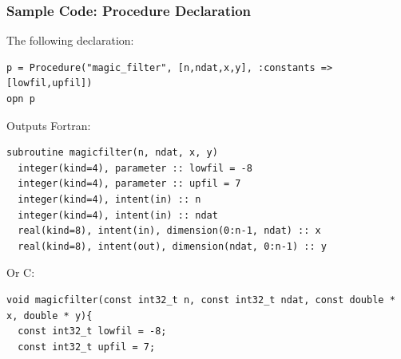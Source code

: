 \documentclass{beamer}
\begin{document}
\begin{frame}[fragile]
\frametitle{Sample Code: Procedure Declaration}
The following declaration:
\tiny
{}
\begin{lstlisting}
p = Procedure("magic_filter", [n,ndat,x,y], :constants => [lowfil,upfil])
opn p
\end{lstlisting}
\normalsize 
Outputs Fortran:
\tiny
{}
\begin{lstlisting}
subroutine magicfilter(n, ndat, x, y)
  integer(kind=4), parameter :: lowfil = -8
  integer(kind=4), parameter :: upfil = 7
  integer(kind=4), intent(in) :: n
  integer(kind=4), intent(in) :: ndat
  real(kind=8), intent(in), dimension(0:n-1, ndat) :: x
  real(kind=8), intent(out), dimension(ndat, 0:n-1) :: y
\end{lstlisting}
\normalsize
Or C:
\tiny
{}
\begin{lstlisting}
void magicfilter(const int32_t n, const int32_t ndat, const double * x, double * y){
  const int32_t lowfil = -8;
  const int32_t upfil = 7;
\end{lstlisting}
\end{frame}
\end{document}
